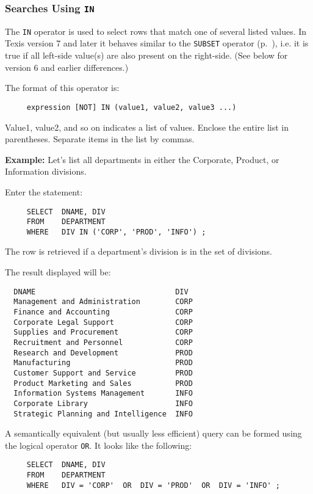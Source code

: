 \subsubsection{Searches Using {\tt IN}}

The {\tt IN} operator is used to select rows that match one of several
listed values.  In Texis version 7 and later it behaves similar to the
{\tt SUBSET} operator (p.~\pageref{SubsetOperator}), i.e. it is true
if all left-side value(s) are also present on the right-side.  (See
below for version 6 and earlier differences.)

The format of this operator is:
\begin{verbatim}
     expression [NOT] IN (value1, value2, value3 ...)
\end{verbatim}

Value1, value2, and so on indicates a list of values.  Enclose the
entire list in parentheses.  Separate items in the list by commas.

{\bf Example:}
Let's list all departments in either the Corporate, Product, or
Information divisions.

Enter the statement:
\begin{verbatim}
     SELECT  DNAME, DIV
     FROM    DEPARTMENT
     WHERE   DIV IN ('CORP', 'PROD', 'INFO') ;
\end{verbatim}
The row is retrieved if a department's division is in the set of
divisions.

The result displayed will be:

\begin{screen}
\begin{verbatim}
  DNAME                                DIV
  Management and Administration        CORP
  Finance and Accounting               CORP
  Corporate Legal Support              CORP
  Supplies and Procurement             CORP
  Recruitment and Personnel            CORP
  Research and Development             PROD
  Manufacturing                        PROD
  Customer Support and Service         PROD
  Product Marketing and Sales          PROD
  Information Systems Management       INFO
  Corporate Library                    INFO
  Strategic Planning and Intelligence  INFO
\end{verbatim}
\end{screen}

A semantically equivalent (but usually less efficient) query can be
formed using the logical operator {\tt OR}.  It looks like the
following:
\begin{verbatim}
     SELECT  DNAME, DIV
     FROM    DEPARTMENT
     WHERE   DIV = 'CORP'  OR  DIV = 'PROD'  OR  DIV = 'INFO' ;
\end{verbatim}

